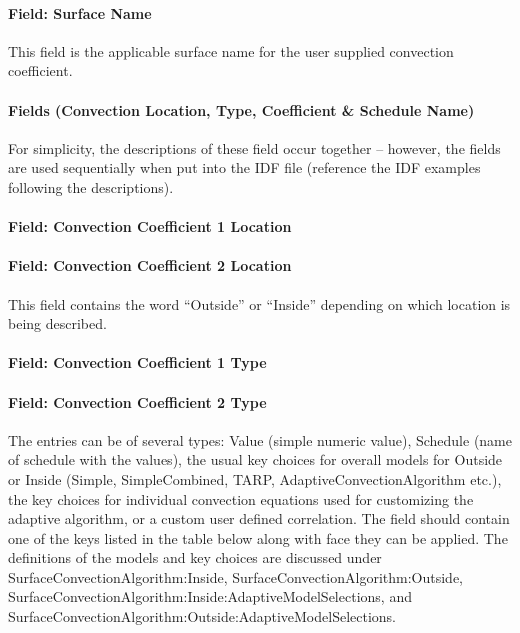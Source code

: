 \paragraph{Field: Surface Name}\label{field-surface-name-2}

This field is the applicable surface name for the user supplied convection coefficient.

\paragraph{Fields (Convection Location, Type, Coefficient \& Schedule Name)}\label{fields-convection-location-type-coefficient-schedule-name}

For simplicity, the descriptions of these field occur together -- however, the fields are used sequentially when put into the IDF file (reference the IDF examples following the descriptions).

\paragraph{Field: Convection Coefficient 1 Location}\label{field-convection-coefficient-1-location}

\paragraph{Field: Convection Coefficient 2 Location}\label{field-convection-coefficient-2-location}

This field contains the word ``Outside'' or ``Inside'' depending on which location is being described.

\paragraph{Field: Convection Coefficient 1 Type}\label{field-convection-coefficient-1-type}

\paragraph{Field: Convection Coefficient 2 Type}\label{field-convection-coefficient-2-type}

The entries can be of several types: Value (simple numeric value), Schedule (name of schedule with the values), the usual key choices for overall models for Outside or Inside (Simple, SimpleCombined, TARP, AdaptiveConvectionAlgorithm etc.), the key choices for individual convection equations used for customizing the adaptive algorithm, or a custom user defined correlation. The field should contain one of the keys listed in the table below along with face they can be applied. The definitions of the models and key choices are discussed under SurfaceConvectionAlgorithm:Inside, SurfaceConvectionAlgorithm:Outside, SurfaceConvectionAlgorithm:Inside:AdaptiveModelSelections, and SurfaceConvectionAlgorithm:Outside:AdaptiveModelSelections.

